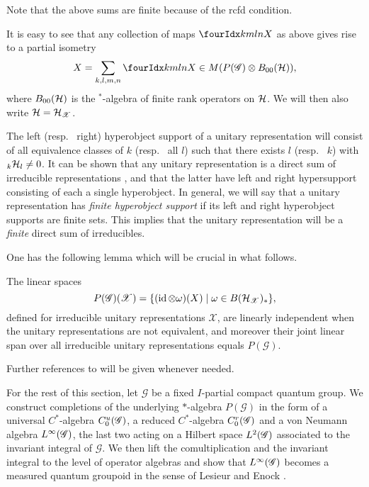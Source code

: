 Note that the above sums are finite because of the rcfd condition.

It is easy to see that any collection of maps $\Gr{X}{k}{l}{m}{n}$ as above gives rise to a partial isometry \[X = \sum_{k,l,m,n}\Gr{X}{k}{l}{m}{n}\in M(P(\mathscr{G})\otimes B_{00}(\Hsp)),\] where $B_{00}(\mathcal{H})$ is the $^*$-algebra of finite rank operators on $\mathcal{H}$. We will then also write $\mathcal{H} = \mathcal{H}_{\mathscr{X}}$.

The left (resp.~ right) hyperobject support of a unitary representation will consist of all equivalence classes of $k$ (resp.~ all $l$) such that there exists $l$ (resp.~ $k$) with ${}_{k}\mathcal{H}_{l}\neq 0$. It can be shown that any unitary representation is a direct sum of irreducible representations \cite[Corollary 2.5]{DCT1}, and that the latter have left and right hypersupport consisting of each a single hyperobject. In general, we will say that a unitary representation has \emph{finite hyperobject support} if its left and right hyperobject supports are finite sets. This implies that the unitary representation will be a \emph{finite} direct sum of irreducibles. 

One has the following lemma which will be crucial in what follows. 

\begin{Lem}\label{LemSpan} The linear spaces \[P(\mathscr{G})(\mathscr{X}) = \{(\operatorname{id}\otimes \omega)(X)\mid \omega \in B(\mathcal{H}_{\mathscr{X}})_*\},\] defined for irreducible unitary representations $\mathscr{X}$, are linearly independent when the unitary representations are not equivalent, and moreover their joint linear span over all irreducible unitary representations equals $P(\mathscr{G})$.
\end{Lem}

Further references to \cite{DCT1} will be given whenever needed. 

For the rest of this section, let $\mathscr{G}$ be a fixed $I$-partial compact quantum group. We construct
completions of the underlying $*$-algebra $P(\mathscr{G})$ in the form
of a universal $C^{*}$-algebra $C^{u}_{0}(\mathscr{G})$, a reduced $C^{*}$-algebra
$C^{r}_{0}(\mathscr{G})$ and a von Neumann algebra $L^{\infty}(\mathscr{G})$, the last two acting on a
Hilbert space $L^{2}(\mathscr{G})$ associated to the invariant integral of
$\mathscr{G}$.  We then lift the comultiplication and the invariant
integral to the level of
operator algebras and show that $L^{\infty}(\mathscr{G})$ becomes a measured quantum
groupoid in the sense of Lesieur \cite{Les1} and Enock \cite{Eno2}.

